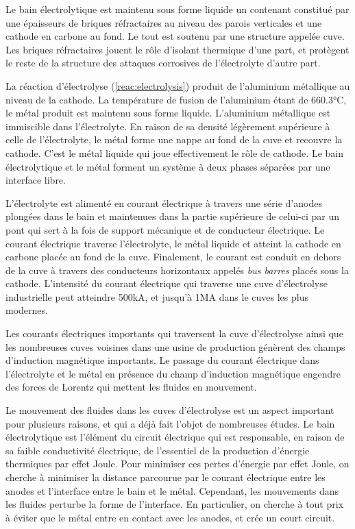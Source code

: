 Le bain électrolytique est maintenu sous forme liquide un contenant
constitué par une épaisseurs de briques réfractaires au niveau des
parois verticales et une cathode en carbone au fond. Le tout est
soutenu par une structure appelée cuve. Les briques réfractaires
jouent le rôle d'isolant thermique d'une part, et protègent le reste
de la structure des attaques corrosives de l'électrolyte d'autre part.

La réaction d'électrolyse (\ref{reac:electrolysis}) produit de
l'aluminium métallique au niveau de la cathode. La température de
fusion de l'aluminium étant de \num{660.3}\si{\celsius}, le métal
produit est maintenu sous forme liquide. L'aluminium métallique est
immiscible dans l'électrolyte. En raison de sa densité légèrement
supérieure à celle de l'électrolyte, le métal forme une nappe au
fond de la cuve et recouvre la cathode. C'est le métal liquide qui
joue effectivement le rôle de cathode. Le bain électrolytique et le
métal forment un système à deux phases séparées par une
interface libre.

L'électrolyte est alimenté en courant électrique à travers une série
d'anodes plongées dans le bain et maintenues dans la partie supérieure
de celui-ci par un pont qui sert à la fois de support mécanique et de
conducteur électrique. Le courant électrique traverse l'électrolyte,
le métal liquide et atteint la cathode en carbone placée au fond de la
cuve. Finalement, le courant est conduit en dehors de la cuve à
travers des conducteurs horizontaux appelés {\em bus barres} placés
sous la cathode. L'intensité du courant électrique qui traverse une
cuve d'électrolyse industrielle peut atteindre
\num{500}\si{\kilo\ampere}, et jusqu'à \num{1}\si{\mega\ampere} dans
le cuves les plus modernes.

Les courants électriques importants qui traversent la cuve
d'électrolyse ainsi que les nombreuses cuves voisines dans une usine
de production génèrent des champs d'induction magnétique
importants. Le passage du courant électrique dans l'électrolyte et le
métal en présence du champ d'induction magnétique engendre des forces
de Lorentz qui mettent les fluides en mouvement.

Le mouvement des fluides dans les cuves d'électrolyse est un aspect
important pour plusieurs raisons, et qui a déjà fait l'objet de
nombreuses études\needcite.  Le bain électrolytique est l'élément du
circuit électrique qui est responsable, en raison de sa faible
conductivité électrique, de l'essentiel de la production d'énergie
thermiques par effet Joule. Pour minimiser ces pertes d'énergie par
effet Joule, on cherche à minimiser la distance parcourue par le
courant électrique entre les anodes et l'interface entre le bain et le
métal. Cependant, les mouvements dans les fluides perturbe la forme de
l'interface. En particulier, on cherche à tout prix à éviter que
le métal entre en contact avec les anodes, et crée un court
circuit.

